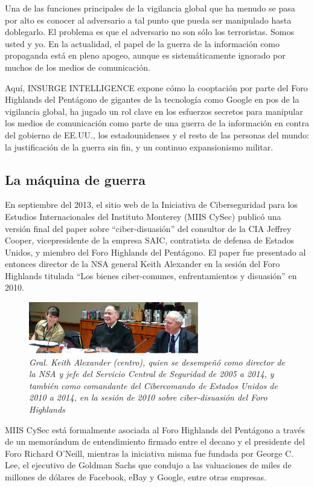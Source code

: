 \documentclass[10pt,a5paper,twoside,spanish,]{book}
\begin{document}
Una de las funciones principales de la vigilancia global que ha menudo
se pasa por alto es conocer al adversario a tal punto que pueda ser
manipulado hasta doblegarlo. El problema es que el adversario no son
sólo los terroristas. Somos usted y yo. En la actualidad, el papel de la
guerra de la información como propaganda está en pleno apogeo, aunque es
sistemáticamente ignorado por muchos de los medios de comunicación.

Aquí, INSURGE INTELLIGENCE expone cómo la cooptación por parte del Foro
Highlands del Pentágono de gigantes de la tecnología como Google en pos
de la vigilancia global, ha jugado un rol clave en los esfuerzos
secretos para manipular los medios de comunicación como parte de una
guerra de la información en contra del gobierno de EE.UU., los
estadounidenses y el resto de las personas del mundo: la justificación
de la guerra sin fin, y un continuo expansionismo militar.

\subsection{La máquina de guerra}\label{la-muxe1quina-de-guerra}

En septiembre del 2013, el sitio web de la Iniciativa de Ciberseguridad
para los Estudios Internacionales del Instituto Monterey (MIIS CySec)
publicó una versión final del paper sobre ``ciber-disuasión'' del
consultor de la CIA Jeffrey Cooper, vicepresidente de la empresa SAIC,
contratista de defensa de Estados Unidos, y miembro del Foro Highlands
del Pentágono. El paper fue presentado al entonces director de la NSA
general Keith Alexander en la sesión del Foro Highlands titulada ``Los
bienes ciber-comunes, enfrentamientos y disuasión'' en 2010.

\begin{figure}[htbp]
\centering
\includegraphics{2.1.png}
\caption{\emph{Gral. Keith Alexander (centro), quien se desempeñó como
director de la NSA y jefe del Servicio Central de Seguridad de 2005 a
2014, y también como comandante del Cibercomando de Estados Unidos de
2010 a 2014, en la sesión de 2010 sobre ciber-disuasión del Foro
Highlands}}
\end{figure}

MIIS CySec está formalmente asociada al Foro Highlands del Pentágono a
través de un memorándum de entendimiento firmado entre el decano y el
presidente del Foro Richard O'Neill, mientras la iniciativa misma fue
fundada por George C. Lee, el ejecutivo de Goldman Sachs que condujo a
las valuaciones de miles de millones de dólares de Facebook, eBay y
Google, entre otras empresas.
\end{document}
